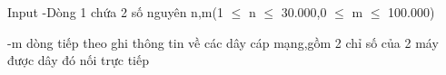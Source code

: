 Input
-Dòng 1 chứa 2 số nguyên n,m(1 $\le$ n $\le$ 30.000,0 $\le$ m $\le$ 100.000)  

   -m dòng tiếp theo ghi thông tin về các dây cáp mạng,gồm 2 chỉ số của 2 máy được dây đó nối trực tiếp